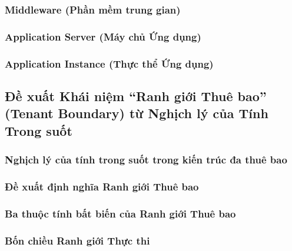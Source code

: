 \par{}
\subsubsection{Middleware (Phần mềm trung gian)}
\label{outline:1:reference-model:16}

\par{}
\subsubsection{Application Server (Máy chủ Ứng dụng)}
\label{outline:1:reference-model:17}

\par{}
\subsubsection{Application Instance (Thực thể Ứng dụng)}
\label{outline:1:reference-model:18}

\par{}
\subsection{Đề xuất Khái niệm “Ranh giới Thuê bao” (Tenant Boundary) từ Nghịch lý của Tính Trong suốt}
\label{outline:1:reference-model:19}

\par{}
\subsubsection{Nghịch lý của tính trong suốt trong kiến trúc đa thuê bao}
\label{outline:1:reference-model:20}

\par{}
\subsubsection{Đề xuất định nghĩa Ranh giới Thuê bao}
\label{outline:1:reference-model:21}

\par{}
\subsubsection{Ba thuộc tính bất biến của Ranh giới Thuê bao}
\label{outline:1:reference-model:22}

\par{}
\subsubsection{Bốn chiều Ranh giới Thực thi}
\label{outline:1:reference-model:23}

